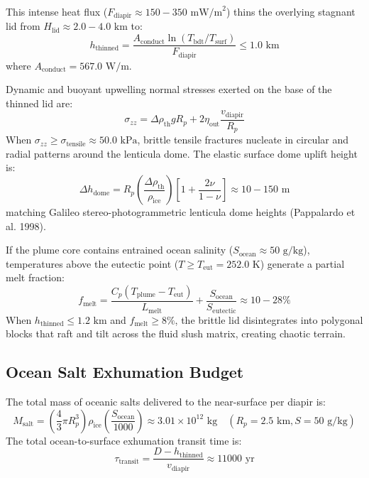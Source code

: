 \documentclass[11pt,a4paper]{article}
\begin{document}
This intense heat flux ($F_{\text{diapir}} \approx 150 - 350\text{ mW/m}^2$) thins the overlying stagnant lid from $H_{\text{lid}} \approx 2.0 - 4.0\text{ km}$ to:
\begin{equation}
h_{\text{thinned}} = \frac{A_{\text{conduct}} \ln(T_{\text{bdt}} / T_{\text{surf}})}{F_{\text{diapir}}} \le 1.0\text{ km}
\end{equation}
where $A_{\text{conduct}} = 567.0\text{ W/m}$.

Dynamic and buoyant upwelling normal stresses exerted on the base of the thinned lid are:
\begin{equation}
\sigma_{zz} = \Delta \rho_{\text{th}} g R_p + 2\eta_{\text{out}} \frac{v_{\text{diapir}}}{R_p}
\end{equation}
When $\sigma_{zz} \ge \sigma_{\text{tensile}} \approx 50.0\text{ kPa}$, brittle tensile fractures nucleate in circular and radial patterns around the lenticula dome. The elastic surface dome uplift height is:
\begin{equation}
\Delta h_{\text{dome}} = R_p \left(\frac{\Delta \rho_{\text{th}}}{\rho_{\text{ice}}}\right) \left[ 1 + \frac{2\nu}{1 - \nu} \right] \approx 10 - 150\text{ m}
\end{equation}
matching Galileo stereo-photogrammetric lenticula dome heights (Pappalardo et al. 1998).

If the plume core contains entrained ocean salinity ($S_{\text{ocean}} \approx 50\text{ g/kg}$), temperatures above the eutectic point ($T \ge T_{\text{eut}} = 252.0\text{ K}$) generate a partial melt fraction:
\begin{equation}
f_{\text{melt}} = \frac{C_p (T_{\text{plume}} - T_{\text{eut}})}{L_{\text{melt}}} + \frac{S_{\text{ocean}}}{S_{\text{eutectic}}} \approx 10 - 28\%
\end{equation}
When $h_{\text{thinned}} \le 1.2\text{ km}$ and $f_{\text{melt}} \ge 8\%$, the brittle lid disintegrates into polygonal blocks that raft and tilt across the fluid slush matrix, creating chaotic terrain.

\subsection{Ocean Salt Exhumation Budget}
The total mass of oceanic salts delivered to the near-surface per diapir is:
\begin{equation}
M_{\text{salt}} = \left( \frac{4}{3} \pi R_p^3 \right) \rho_{\text{ice}} \left( \frac{S_{\text{ocean}}}{1000} \right) \approx 3.01 \times 10^{12}\text{ kg} \quad (R_p = 2.5\text{ km}, S = 50\text{ g/kg})
\end{equation}
The total ocean-to-surface exhumation transit time is:
\begin{equation}
\tau_{\text{transit}} = \frac{D - h_{\text{thinned}}}{v_{\text{diapir}}} \approx 11000\text{ yr}
\end{equation}
\end{document}
